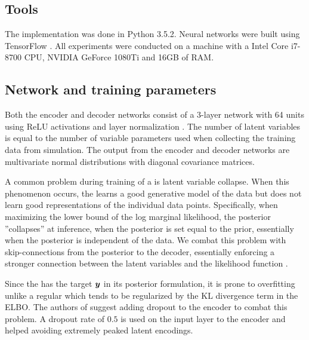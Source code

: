 

\subsection{Tools}

The implementation was done in Python 3.5.2. Neural networks were built using TensorFlow \parencite{tensorflow2015-whitepaper}. 
All experiments were conducted on a machine with a Intel Core i7-8700 CPU, NVIDIA GeForce 1080Ti and 16GB of RAM.

\subsection{Network and training parameters}
Both the encoder and decoder networks consist of a 3-layer network with 64 units using ReLU activations and layer normalization \parencite{Ba2016}. The number of latent variables is equal to the number of variable parameters used when collecting the training data from simulation. The output from the encoder and decoder networks are multivariate normal distributions with diagonal covariance matrices.

A common problem during training of a \vae{} is latent variable collapse. When this phenomenon occurs, the \vae{} learns a good generative model of the data but does not learn good representations of the individual data points. Specifically, when maximizing the lower bound of the log marginal likelihood, the posterior ''collapses'' at inference, when the posterior is set equal to the prior, essentially when the posterior is independent of the data. We combat this problem with skip-connections from the posterior to the decoder, essentially enforcing a stronger connection between the latent variables and the likelihood function \parencite{Dieng2018}.

Since the \cvae{} has the target $\boldsymbol{y}$ in its posterior formulation, it is prone to overfitting unlike a regular \vae{} which tends to be regularized by the KL divergence term in the ELBO. The authors of \parencite{Sohn2015} suggest adding dropout to the encoder to combat this problem. A dropout rate of $0.5$ is used on the input layer to the encoder and helped avoiding extremely peaked latent encodings.

